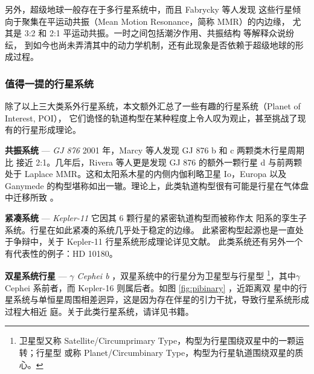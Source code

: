 另外，超级地球一般存在于多行星系统中\cite{Borucki2011}，而且 Fabrycky 等人发现
这些行星倾向于聚集在平运动共振（Mean Motion Resonance，简称 MMR）的内边缘，
尤其是 3:2 和 2:1 平运动共振\cite{Fabrycky2014}。一时之间包括潮汐作用、共振结构
等解释众说纷纭\cite{LithwickWu2012,Lee2013,Batygin2013,Baruteau2013,Delisle2014,Chatterjee2015}，
到如今也尚未弄清其中的动力学机制，还有此现象是否依赖于超级地球的形成过程。

\subsubsection{值得一提的行星系统} 

除了以上三大类系外行星系统，本文额外汇总了一些有趣的行星系统（Planet of Interest, POI），
它们诡怪的轨道构型在某种程度上令人叹为观止，甚至挑战了现有的行星形成理论。

\textbf{共振系统} --- \textit{GJ 876}  {} 2001 年，Marcy 等人发现 GJ 876 b 和 c 两颗类木行星周期比
接近 2:1\cite{Marcy2001}。几年后，Rivera 等人更是发现 GJ 876 的额外一颗行星 d 与前两颗
处于 Laplace MMR\cite{Rivera2010}。这和太阳系木星的内侧内伽利略卫星 Io，Europa 以及 
Ganymede 的构型堪称如出一辙。理论上，此类轨道构型很有可能是行星在气体盘中迁移所致
\cite{KleyNelson2012,ZhangZhou2010}。

\textbf{紧凑系统} --- \textit{Kepler-11}  {} 它因其 6 颗行星的紧密轨道构型\cite{Lissauer2011}而被称作太
阳系的孪生子系统\cite{Zhou2012}。行星在如此紧凑的系统几乎处于稳定的边缘\cite{Mahajan2014}。
此紧密构型起源也是一直处于争辩中，关于 Kepler-11 行星系统形成理论详见文献。
此类系统还有另外一个有代表性的例子：HD 10180\cite{Lovis2011}。

\textbf{双星系统行星} --- \textit{$\gamma$ Cephei b}  {} ，双星系统中的行星分为卫星型与行星型
\footnote{卫星型又称 Satellite/Circumprimary Type，构型为行星围绕双星中的一颗运转；行星型
或称 Planet/Circumbinary Type，构型为行星轨道围绕双星的质心。}，其中$\gamma$ Cephei
\cite{Hatzes2003} 系前者，而 Kepler-16\cite{Doyle2011} 则属后者。如图 \ref{fig:pibinary} ，近距离双
星中的行星系统与单恒星周围相差迥异，这是因为存在伴星的引力干扰，导致行星系统形成过程大相近
庭。关于此类行星系统，请详见书籍。

